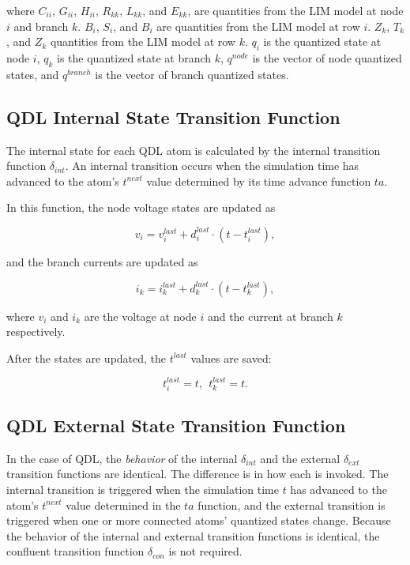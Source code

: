 \noindent where $C_{ii}$, $G_{ii}$, $H_{ii}$, $R_{kk}$, $L_{kk}$, and $E_{kk}$, are quantities from the LIM model at node $i$ and branch $k$. $B_i$, $S_i$, and $B_i$ are quantities from the LIM model at row $i$. $Z_k$, $T_k$, and $Z_k$ quantities from the LIM model at row $k$. $q_i$ is the quantized state at node $i$, $q_k$ is the quantized state at branch $k$, $q^{node}$ is the vector of node quantized states, and $q^{branch}$ is the vector of branch quantized states.

\subsection{QDL Internal State Transition Function} 

The internal state for each QDL atom is calculated by the internal transition function $\delta_{int}$. An internal transition occurs when the simulation time has advanced to the atom's $t^{next}$ value determined by its time advance function $ta$.

\noindent In this function, the node voltage states are updated as

\begin{equation}\label{eq:delta_int_node}
    v_i = v_i^{last} + d_i^{last} \cdot \left(t - t_i^{last}\right),
\end{equation}

\noindent and the branch currents are updated as

\begin{equation}\label{eq:delta_int_branch}
    i_k = i_k^{last} + d_k^{last} \cdot \left(t - t_k^{last}\right),
\end{equation}

\noindent where $v_i$ and $i_k$ are the voltage at node $i$ and the current at branch $k$ respectively.

\noindent After the states are updated, the $t^{last}$ values are saved:

\begin{equation} \label{eq:delta_int_save}
    t_i^{last} = t, \ \ t_k^{last} = t.
\end{equation}

\subsection{QDL External State Transition Function} 

In the case of QDL, the \emph{behavior} of the internal $\delta_{int}$ and the external $\delta_{ext}$ transition functions are identical. The difference is in how each is invoked. The internal transition is triggered when the simulation time $t$ has advanced to the atom's $t^{next}$ value determined in the $ta$ function, and the external transition is triggered when one or more connected atoms' quantized states change. Because the behavior of the internal and external transition functions is identical, the confluent transition function $\delta_{con}$ is not required.

